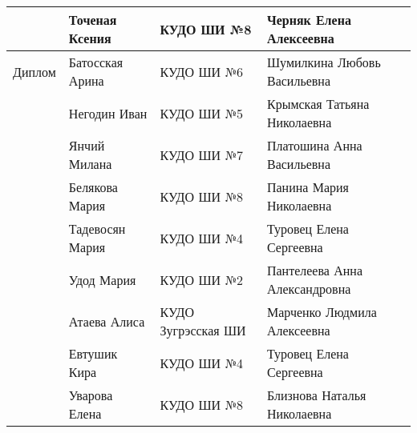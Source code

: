 \begin{longtable}{|l|l|l|l|}
\hline             & Точеная Ксения        & КУДО ШИ №8         & Черняк Елена Алексеевна          \\
\hline Диплом      & Батосская Арина       & КУДО ШИ №6         & Шумилкина Любовь Васильевна      \\
\hline             & Негодин Иван          & КУДО ШИ №5         & Крымская Татьяна Николаевна      \\
\hline             & Янчий Милана          & КУДО ШИ №7         & Платошина Анна Васильевна        \\
\hline             & Белякова Мария        & КУДО ШИ №8         & Панина Мария Николаевна          \\
\hline             & Тадевосян Мария       & КУДО ШИ №4         & Туровец Елена Сергеевна          \\
\hline             & Удод Мария            & КУДО ШИ №2         & Пантелеева Анна Александровна    \\
\hline             & Атаева Алиса          & КУДО Зугрэсская ШИ & Марченко Людмила Алексеевна      \\
\hline             & Евтушик Кира          & КУДО ШИ №4         & Туровец Елена Сергеевна          \\
\hline             & Уварова Елена         & КУДО ШИ №8         & Близнова Наталья Николаевна      \\
\hline
\end{longtable}
